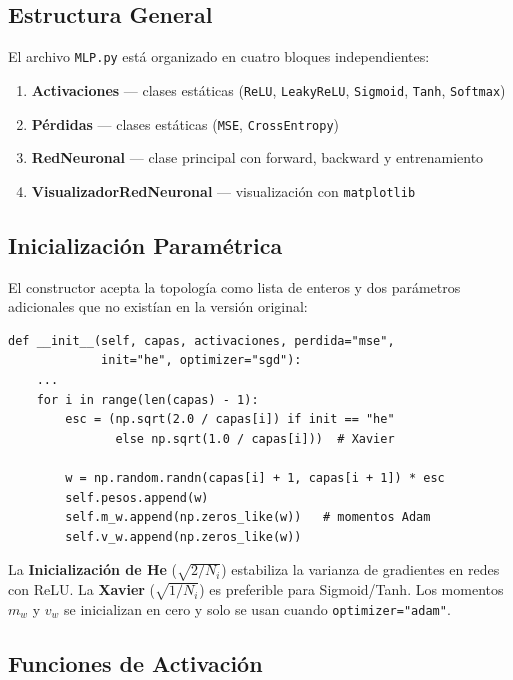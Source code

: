 \subsection{Estructura General}

El archivo \texttt{MLP.py} está organizado en cuatro bloques independientes:

\begin{enumerate}[noitemsep]
    \item \textbf{Activaciones} --- clases estáticas (\texttt{ReLU}, \texttt{LeakyReLU}, \texttt{Sigmoid}, \texttt{Tanh}, \texttt{Softmax})
    \item \textbf{Pérdidas} --- clases estáticas (\texttt{MSE}, \texttt{CrossEntropy})
    \item \textbf{RedNeuronal} --- clase principal con forward, backward y entrenamiento
    \item \textbf{VisualizadorRedNeuronal} --- visualización con \texttt{matplotlib}
\end{enumerate}

\subsection{Inicialización Paramétrica}

El constructor acepta la topología como lista de enteros y dos parámetros adicionales que
no existían en la versión original:

\begin{lstlisting}[style=python, caption={Constructor de RedNeuronal}]
def __init__(self, capas, activaciones, perdida="mse",
             init="he", optimizer="sgd"):
    ...
    for i in range(len(capas) - 1):
        esc = (np.sqrt(2.0 / capas[i]) if init == "he"
               else np.sqrt(1.0 / capas[i]))  # Xavier

        w = np.random.randn(capas[i] + 1, capas[i + 1]) * esc
        self.pesos.append(w)
        self.m_w.append(np.zeros_like(w))   # momentos Adam
        self.v_w.append(np.zeros_like(w))
\end{lstlisting}

La \textbf{Inicialización de He} ($\sqrt{2/N_i}$) estabiliza la varianza de gradientes en
redes con ReLU. La \textbf{Xavier} ($\sqrt{1/N_i}$) es preferible para Sigmoid/Tanh.
Los momentos $m_w$ y $v_w$ se inicializan en cero y solo se usan cuando
\texttt{optimizer="adam"}.

\subsection{Funciones de Activación}

